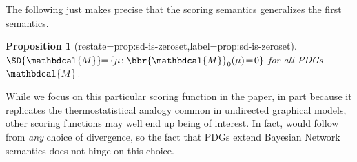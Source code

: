 \documentclass[letterpaper]{article} %
\theoremstyle{plain}
\newtheorem{prop}[theorem]{Proposition}
\theoremstyle{definition}
\theoremstyle{remark}
\newcommand{\dg}[1]{\mathbdcal{#1}}
\newcommand\Inc{\mathit{Inc}}
\newcommand{\begthm}[2]{\begin{#1}[restate=#2,label=#2]}
\begin{document}
        The following just makes precise that the scoring semantics
        generalizes the first semantics.
\begthm{prop}{prop:sd-is-zeroset}
$\SD{\dg M}\!\! =\! \{ \mu\! : \bbr{\dg M}_0(\mu) \!=\! 0\}$ for 
all PDGs 
$\dg M$.
\end{prop}
          
While we focus on this particular scoring function
in the paper, 
in part because
it replicates the thermostatistical analogy common in undirected graphical models,
other scoring functions may well end up being of interest. 
In fact,  would follow from \emph{any} choice of divergence, so the fact that PDGs extend Bayesian Network semantics does not hinge on this choice.
        
	
\end{document}
